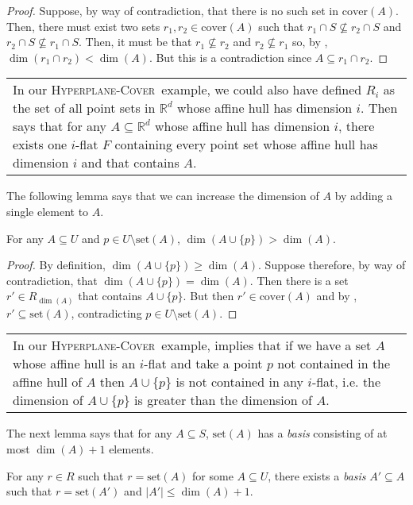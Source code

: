 \documentclass[ccfonts,lotsofwhite]{patmorin}
\newcommand{\hppc}{\textsc{Hyperplane-Cover}}
\newcommand{\cover}{\mathrm{cover}}
\newcommand{\set}{\mathrm{set}}
\newenvironment{example}{%
	\addtolength{\textwidth}{-1cm}
	\begin{center}\begin{tabular}{|p{\textwidth}|}}
	{\end{tabular}\end{center}}
\begin{document}
\begin{proof}
Suppose, by way of contradiction, that there is no such set in
$\cover(A)$.  Then, there must exist two sets $r_1,r_2\in\cover(A)$
such that $r_1\cap S\not\subseteq r_2\cap S$ and $r_2\cap
S\not\subseteq r_1\cap S$.  Then, it must be that $r_1\not\subseteq
r_2$ and $r_2\not\subseteq r_1$ so, by ,
$\dim(r_1 \cap r_2) < \dim(A)$.  But this is a contradiction since
$A\subseteq r_1\cap r_2$.
\end{proof}

\begin{example}
In our \hppc\ example, we could also have defined $R_i$ as the set of
all point sets in $\mathbb{R}^d$ whose affine hull has dimension $i$.
Then \lemref{set-a} says that for any $A\subseteq\mathbb{R}^d$ whose
affine hull has dimension $i$, there exists one $i$-flat $F$
containing every point set whose affine hull has dimension $i$ and
that contains $A$.
\end{example}

The following lemma says that we can increase the dimension of $A$ by
adding a single element to $A$.

\begin{lem}
For any $A\subseteq U$ and $p\in U\setminus\set(A)$,
$\dim(A\cup\{p\}) > \dim(A)$.
\end{lem}

\begin{proof}
By definition, $\dim(A\cup\{p\})\ge\dim(A)$.  Suppose therefore, by
way of contradiction, that $\dim(A\cup\{p\})=\dim(A)$.  Then there is
a set $r'\in R_{\dim(A)}$ that contains $A\cup\{p\}$.  But then
$r'\in\cover(A)$ and by , $r'\subseteq\set(A)$,
contradicting $p\in U\setminus\set(A)$.
\end{proof}

\begin{example}
In our \hppc\ example, \lemref{increase-dimension} implies that if we
have a set $A$ whose affine hull is an $i$-flat and take a point $p$
not contained in the affine hull of $A$ then $A\cup\{p\}$ is not
contained in any $i$-flat, i.e. the dimension of $A\cup\{p\}$ is
greater than the dimension of $A$.
\end{example}

The next lemma says that for any $A\subseteq S$, $\set(A)$ has a
\emph{basis} consisting of at most $\dim(A)+1$ elements.

\begin{lem}
For any $r\in R$ such that $r=\set(A)$ for some $A\subseteq U$, there
exists a \emph{basis} $A'\subseteq A$ such that $r=\set(A')$ and
$|A'|\le\dim(A)+1$.
\end{lem}
\end{document}
